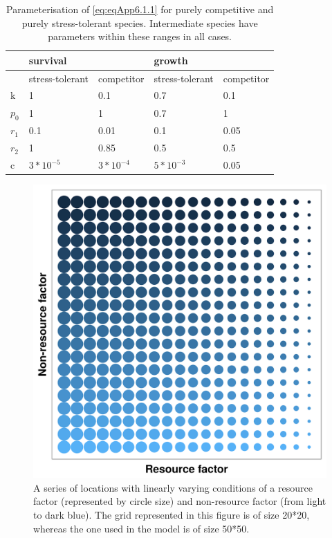 \begin{table}[]
\caption[Response curves parameterization]{\color{Gray}Parameterisation of \ref{eq:eqApp6.1.1} for purely competitive and purely stress-tolerant species. Intermediate species have parameters within these ranges in all cases.}\label{tab:tabApp6.1.1}
\begin{tabular}{lllll}
\hline
  & \multicolumn{2}{l}{survival} & \multicolumn{2}{l}{growth}   \\
\hline
      & stress-tolerant & competitor    & stress-tolerant & competitor \\
k     & 1               & 0.1           & 0.7             & 0.1          \\
$p_0$ & 1               & 1             & 0.7             & 1          \\
$r_1$ & 0.1             & 0.01          & 0.1             & 0.05          \\
$r_2$ & 1               & 0.85          & 0.5             & 0.5          \\
c     & $3*10^{-5}$     & $3*10^{-4}$   & $5*10^{-3}$     & 0.05
\end{tabular}

\end{table}

\begin{figure}[!ht]
\centering
\includegraphics[width=.5\textwidth]{./Figures/Appendix6_1/Fig_1.png}
\caption[Environmental grid]{\color{Gray} A series of locations with linearly varying conditions of a resource factor (represented by circle size) and non-resource factor (from light to dark blue). The grid represented in this figure is of size 20*20, whereas the one used in the model is of size 50*50.}
\label{fig:figApp6.1.1}
\end{figure}


